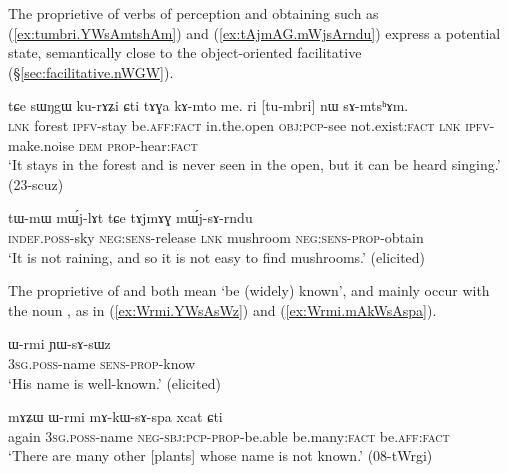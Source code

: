 The proprietive of verbs of perception and obtaining such as  (\ref{ex:tumbri.YWsAmtshAm}) and  (\ref{ex:tAjmAG.mWjsArndu}) express a potential state, semantically close to the object-oriented facilitative (§\ref{sec:facilitative.nWGW}).

\begin{exe}
\ex \label{ex:tumbri.YWsAmtshAm}
\gll tɕe sɯŋgɯ ku-rɤʑi ɕti tɤɣa kɤ-mto me. ri [tu-mbri] nɯ sɤ-mtsʰɤm.\\
\textsc{lnk} forest \textsc{ipfv}-stay be.\textsc{aff}:\textsc{fact} in.the.open \textsc{obj}:\textsc{pcp}-see not.exist:\textsc{fact} \textsc{lnk} \textsc{ipfv}-make.noise \textsc{dem} \textsc{prop}-hear:\textsc{fact} \\
\glt `It stays in the forest and is never seen in the open, but it can be heard singing.' (23-scuz)
\end{exe}

\begin{exe}
\ex \label{ex:tAjmAG.mWjsArndu}
\gll tɯ-mɯ mɯ́j-lɤt tɕe tɤjmɤɣ mɯ́j-sɤ-rndu\\
\textsc{indef}.\textsc{poss}-sky \textsc{neg}:\textsc{sens}-release \textsc{lnk} mushroom \textsc{neg}:\textsc{sens}-\textsc{prop}-obtain\\
\glt `It is not raining, and so it is not easy to find mushrooms.' (elicited)
\end{exe}

The proprietive of  and  both mean `be (widely) known', and mainly occur with the noun , as in (\ref{ex:Wrmi.YWsAsWz}) and (\ref{ex:Wrmi.mAkWsAspa}).

\begin{exe}
\ex \label{ex:Wrmi.YWsAsWz}
\gll ɯ-rmi ɲɯ-sɤ-sɯz \\
\textsc{3sg}.\textsc{poss}-name \textsc{sens}-\textsc{prop}-know \\
\glt `His name is well-known.' (elicited)
\end{exe}

\begin{exe}
\ex \label{ex:Wrmi.mAkWsAspa}
\gll mɤʑɯ ɯ-rmi mɤ-kɯ-sɤ-spa xcat ɕti \\
again \textsc{3sg}.\textsc{poss}-name \textsc{neg}-\textsc{sbj}:\textsc{pcp}-\textsc{prop}-be.able be.many:\textsc{fact} be.\textsc{aff}:\textsc{fact} \\
\glt `There are many other [plants] whose name is not known.' (08-tWrgi) 
\end{exe}
 
